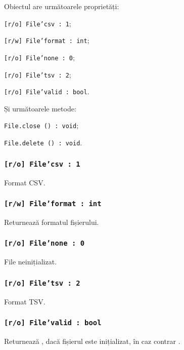 Obiectul \file{} are următoarele proprietăți:
\begin{icItems}
	\item \texttt{[r/o] File'csv : 1};
	\item \texttt{[r/w] File'format : int};
	\item \texttt{[r/o] File'none : 0};
	\item \texttt{[r/o] File'tsv : 2};
	\item \texttt{[r/o] File'valid : bool}.
\end{icItems}

Și următoarele metode:
\begin{icItems}
	\item \texttt{File.close () : void};
	\item \texttt{File.delete () : void}.
\end{icItems}

\subsubsection{\texttt{[r/o] File'csv : 1}}

Format CSV.

\subsubsection{\texttt{[r/w] File'format : int}}

Returnează formatul fișierului.

\subsubsection{\texttt{[r/o] File'none : 0}}

File neinițializat.

\subsubsection{\texttt{[r/o] File'tsv : 2}}

Format TSV.

\subsubsection{\texttt{[r/o] File'valid : bool}}

Returnează \true, dacă fișierul este inițializat, în caz contrar \false.

